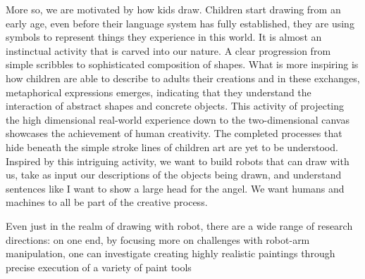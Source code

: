 More so, we are motivated by how kids draw. Children start drawing from an early age, even before their language system has fully established, they are using symbols to represent things they experience in this world. It is almost an instinctual activity that is carved into our nature. A clear progression from simple scribbles to sophisticated composition of shapes. What is more inspiring is how children are able to describe to adults their creations and in these exchanges, metaphorical expressions emerges, indicating that they understand the interaction of abstract shapes and concrete objects. This activity of projecting the high dimensional real-world experience down to the two-dimensional canvas showcases the achievement of human creativity. The completed processes that hide beneath the simple stroke lines of children art are yet to be understood. Inspired by this intriguing activity, we want to build robots that can draw with us, take as input our descriptions of the objects being drawn, and understand sentences like I want to show a large head for the angel. We want humans and machines to all be part of the creative process.   

Even just in the realm of drawing with robot, there are a wide range of research directions: on one end, by focusing more on challenges with robot-arm manipulation, one can investigate creating highly realistic paintings through precise execution of a variety of paint tools   








